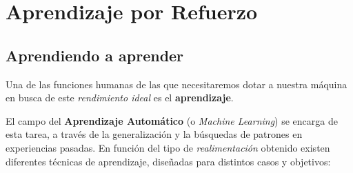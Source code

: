 \chapter{Aprendizaje por Refuerzo}
\label{cap:reinforcementLearning}



\section{Aprendiendo a aprender}

Una de las funciones humanas de las que necesitaremos dotar a nuestra máquina en busca de este \textit{rendimiento ideal} es el \textbf{aprendizaje}.

El campo del \textbf{Aprendizaje Automático} (o \textit{Machine Learning}) se encarga de esta tarea, a través de la generalización y la búsquedas de patrones en experiencias pasadas. En función del tipo de \textit{realimentación} obtenido existen diferentes técnicas de aprendizaje, diseñadas para distintos casos y objetivos:
